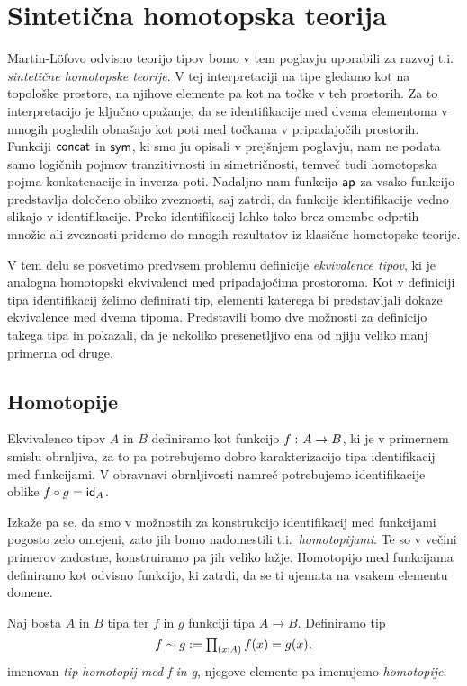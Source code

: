 \section{Sintetična homotopska teorija}
Martin-Löfovo odvisno teorijo tipov bomo v tem poglavju uporabili za razvoj t.i. \emph{sintetične homotopske teorije}. V tej interpretaciji na tipe gledamo kot na topološke prostore, na njihove elemente pa kot na točke v teh prostorih. Za to interpretacijo je ključno opažanje, da se identifikacije med dvema elementoma v mnogih pogledih obnašajo kot poti med točkama v pripadajočih prostorih. Funkciji \(\textnormal{\textsf{concat}}\) in \(\textnormal{\textsf{sym}}\), ki smo ju opisali v prejšnjem poglavju, nam ne podata samo logičnih pojmov tranzitivnosti in simetričnosti, temveč tudi homotopska pojma konkatenacije in inverza poti. Nadaljno nam funkcija \(\textnormal{\textsf{ap}}\) za vsako funkcijo predstavlja določeno obliko zveznosti, saj zatrdi, da funkcije identifikacije vedno slikajo v identifikacije.
Preko identifikacij lahko tako brez omembe odprtih množic ali zveznosti pridemo do mnogih rezultatov iz klasične homotopske teorije.

V tem delu se posvetimo predvsem problemu definicije \emph{ekvivalence tipov}, ki je analogna homotopski ekvivalenci med pripadajočima prostoroma. Kot v definiciji tipa  identifikacij želimo definirati tip, elementi katerega bi predstavljali dokaze ekvivalence med dvema tipoma. Predstavili bomo dve možnosti za definicijo takega tipa in pokazali, da je nekoliko presenetljivo ena od njiju veliko manj primerna od druge.

\subsection{Homotopije}
Ekvivalenco tipov \(A\) in \(B\) definiramo kot funkcijo \(f \,\colon A \to B\), ki
je v primernem smislu obrnljiva, za to pa potrebujemo dobro karakterizacijo tipa identifikacij med funkcijami. V obravnavi obrnljivosti namreč potrebujemo identifikacije oblike \(f \circ g = \textnormal{\textsf{id}}_{A}\).

Izkaže pa se, da smo v možnostih za konstrukcijo identifikacij med funkcijami pogosto zelo omejeni, zato jih bomo nadomestili t.i.~\emph{homotopijami}. Te so v večini primerov zadostne, konstruiramo pa jih veliko lažje. Homotopijo med funkcijama definiramo kot odvisno funkcijo, ki zatrdi, da se ti ujemata na vsakem elementu domene.
\begin{definicija}
  Naj bosta \(A\) in \(B\) tipa ter \(f\) in \(g\) funkciji tipa \(A \to B\). Definiramo tip
  \[f \sim g := \textstyle \prod_{\left( {x : A} \right)} f(x) = g(x),\]
  imenovan \emph{tip homotopij med f in g}, njegove elemente pa imenujemo \emph{homotopije}.
\end{definicija}

